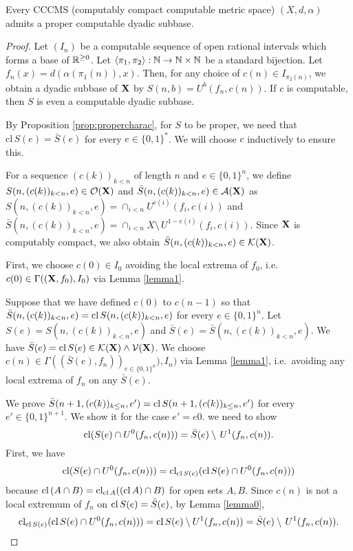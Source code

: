 \documentclass{eptcs-modified}
\begin{document}
\begin{theorem}
\label{theo:dyadicexists}
Every CCCMS (computably compact computable metric space) $(X, d, \alpha)$ admits a proper computable dyadic subbase.
\end{theorem}
\begin{proof}
Let $(I_n)$ be a computable sequence of  open rational intervals which forms a base of $\mathbb{R}^{\geq 0}$.   Let $\langle \pi_1, \pi_2 \rangle: \mathbb{N} \to \mathbb{N} \times \mathbb{N}$ be a standard bijection. Let $f_n(x) = d(\alpha(\pi_1(n)), x)$.
Then, for any choice of $c(n) \in I_{\pi_2(n)}$, we obtain a dyadic subbase of $\mathbf{X}$ by $S(n,b) = U^b(f_n, c(n))$. If $c$ is computable, then $S$ is even a computable dyadic subbase.

By Proposition \ref{prop:propercharac}, for $S$ to be proper, we need that
$\textrm{cl}\,S(e)=\bar{S}(e)$ for every $e \in \{0,1\}^*$. We will choose $c$ inductively to ensure this.


For a sequence $(c(k))_{k < n}$ of length $n$ and $e \in \{0,1\}^n$,
we define $S(n, (c(k))_{k < n}, e) \in \mathcal{O}(\mathbf{X})$ and $\bar{S}(n, (c(k))_{k < n}, e) \in \mathcal{A}(\mathbf{X})$
as  $S(n, (c(k))_{k < n}, e) = \cap_{i<n} U^{e(i)}(f_i, c(i))$ and
$\bar{S}(n, (c(k))_{k < n}, e) = \cap_{i<n} X \setminus\, U^{1-e(i)}(f_i, c(i))$. Since $\mathbf{X}$ is computably compact, we also obtain $\bar{S}(n, (c(k))_{k < n}, e) \in \mathcal{K}(\mathbf{X})$.

First, we choose $c(0) \in I_0$ avoiding the local extrema of $f_0$, i.e.~$c(0) \in \Gamma((\mathbf{X}, f_0), I_0)$ via Lemma \ref{lemma1}.

Suppose that we have defined $c(0)$ to $c(n-1)$ so that
$\bar{S}(n, (c(k))_{k < n}, e) = \textrm{cl}\,  S(n, (c(k))_{k < n}, e)$ for every $e \in \{0,1\}^n$.
Let $S(e) = S(n, (c(k))_{k < n}, e)$ and $\bar{S}(e) = \bar{S}(n, (c(k))_{k < n}, e)$.  We have $\bar{S}(e) = \textrm{cl}\, S(e) \in \mathcal{K}(\mathbf{X}) \wedge \mathcal{V}(\mathbf{X})$.
We choose $c(n) \in \Gamma((\bar{S}(e), f_n))_{e \in \{0,1\}^n}), I_n)$ via Lemma \ref{lemma1}, i.e.~avoiding any local extrema of $f_n$ on any $\bar{S}(e)$.

We prove $\bar{S}(n+1, (c(k))_{k \leq n}, e') = \textrm{cl}\,  S(n+1, (c(k))_{k \leq n}, e')$ for every $e' \in \{0,1\}^{n+1}$.  We show it for the case $e' = e0$.
we need to show
\[
\textrm{cl} (S(e) \cap U^{0}(f_n, c(n))) = \bar{S}(e) \setminus\, U^{1}(f_n, c(n)).
\]
First, we have
\[
  \textrm{cl} (S(e) \cap U^{0}(f_n, c(n))) = \textrm{cl}_{\textrm{cl}\, S(e)}(\textrm{cl}\, S(e) \cap U^0(f_n, c(n)))
\]
because $\textrm{cl}\, (A \cap B) = \textrm{cl}_{\textrm{cl}\,{A}} ((\textrm{cl}\, A) \cap B)$ for open sets $A, B$.
Since $c(n)$ is not a local extremum of $f_n$ on $\textrm{cl}\, S(e) = \bar{S}(e)$, by Lemma \ref{lemma0},
\[
\textrm{cl}_{\textrm{cl}\, S(e)}(\textrm{cl}\, S(e) \cap U^0(f_n, c(n))) = \textrm{cl}\, S(e) \setminus U^1(f_n, c(n)) = \bar{S}(e) \setminus\, U^{1}(f_n, c(n)).
\]


\end{proof}
\end{document}
